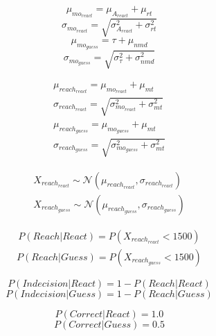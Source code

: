 \documentclass[12pt,letterpaper]{article}
\begin{document}
\begin{equation}
    \mu_{mo_{react}} = \mu_{A_{react}} + \mu_{rt}
\end{equation}
\begin{equation}
    \sigma_{mo_{react}} = \sqrt{\sigma_{A_{react}}^2 + \sigma_{rt}^2}
\end{equation}
\begin{equation}
    \mu_{mo_{guess}} = \tau +  \mu_{nmd}
\end{equation}
\begin{equation}
    \sigma_{mo_{guess}} = \sqrt{\sigma_{\tau}^2 + \sigma_{nmd}^2}
\end{equation}

\begin{align}
    \mu_{reach_{react}} =\mu_{mo_{react}} + \mu_{mt}                      \\
    \sigma_{reach_{react}} = \sqrt{\sigma_{mo_{react}}^2 + \sigma_{mt}^2} \\
    \mu_{reach_{guess}} =\mu_{mo_{guess}} + \mu_{mt}                      \\
    \sigma_{reach_{guess}} = \sqrt{\sigma_{mo_{guess}}^2 + \sigma_{mt}^2}
\end{align}

\begin{align}
    X_{reach_{react}} \sim \mathcal{N}(\mu_{reach_{react}}, \sigma_{reach_{react}}) \\
    X_{reach_{guess}} \sim \mathcal{N}(\mu_{reach_{guess}}, \sigma_{reach_{guess}})
\end{align}

\begin{align}
    P(Reach|React) = P(X_{reach_{react}} < 1500)
\end{align}
\begin{align}
    P(Reach|Guess) = P(X_{reach_{guess}} < 1500)
\end{align}

\begin{equation}
    P(Indecision|React) = 1 - P(Reach|React)
\end{equation}
\begin{equation}
    P(Indecision|Guess) = 1 - P(Reach|Guess)
\end{equation}

\begin{equation}
    P(Correct|React) = 1.0
\end{equation}
\begin{equation}
    P(Correct|Guess) = 0.5
\end{equation}
\end{document}

